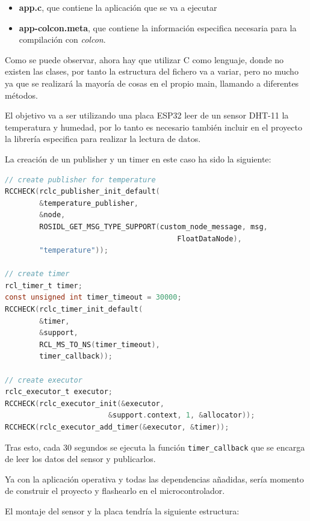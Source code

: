 \begin{itemize}
    \item \textbf{app.c}, que contiene la aplicación que se va a ejecutar
    \item \textbf{app-colcon.meta}, que contiene la información especifica necesaria para la compilación con \textit{colcon}.
\end{itemize}

Como se puede observar, ahora hay que utilizar C como lenguaje, donde no existen las clases, por tanto la estructura del fichero va a variar, pero no mucho ya que se realizará la mayoría de cosas en el propio main, llamando a diferentes métodos.

El objetivo va a ser utilizando una placa ESP32 leer de un sensor DHT-11 la temperatura y humedad, por lo tanto es necesario también incluir en el proyecto la librería especifica para realizar la lectura de datos.

La creación de un publisher y un timer en este caso ha sido la siguiente:

\begin{lstlisting}[language=C, caption=Publisher Timer y Executor en C para microcontrolador]
// create publisher for temperature
RCCHECK(rclc_publisher_init_default(
        &temperature_publisher,
        &node,
        ROSIDL_GET_MSG_TYPE_SUPPORT(custom_node_message, msg, 
                                        FloatDataNode),
        "temperature"));
        
// create timer
rcl_timer_t timer;
const unsigned int timer_timeout = 30000;
RCCHECK(rclc_timer_init_default(
        &timer,
        &support,
        RCL_MS_TO_NS(timer_timeout),
        timer_callback));

// create executor
rclc_executor_t executor;
RCCHECK(rclc_executor_init(&executor, 
                        &support.context, 1, &allocator));
RCCHECK(rclc_executor_add_timer(&executor, &timer));
\end{lstlisting}

Tras esto, cada 30 segundos se ejecuta la función \verb|timer_callback| que se encarga de leer los datos del sensor y publicarlos.

Ya con la aplicación operativa y todas las dependencias añadidas, sería momento de construir el proyecto y flashearlo en el microcontrolador.

El montaje del sensor y la placa tendría la siguiente estructura:

\newpage

